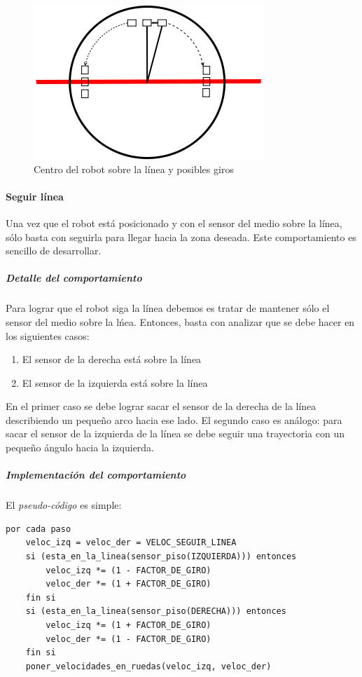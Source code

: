 \begin{figure}[htp]
\begin{center}
\includegraphics[scale=0.4]{comportamientos/floorSensorsLine3.png}
\caption{Centro del robot sobre la l\'inea y posibles giros}
\label{fig:positioned}
\end{center}
\end{figure}

\paragraph{Seguir l\'inea}
\label{follow_line}
Una vez que el robot est\'a posicionado y con el sensor del medio sobre la
l\'inea, s\'olo basta con seguirla para llegar hacia la zona deseada. Este
comportamiento es sencillo de desarrollar.

\subparagraph{Detalle del comportamiento}
Para lograr que el robot siga la l\'inea debemos es tratar de mantener
s\'olo el sensor del medio sobre la l\'nea. Entonces, basta con analizar que se
debe hacer en los siguientes casos:
\begin{enumerate}
	\item El sensor de la derecha est\'a sobre la l\'inea
	\item El sensor de la izquierda est\'a sobre la l\'inea
\end{enumerate}
En el primer caso se debe lograr sacar el sensor de la derecha de la l\'inea
describiendo un peque\~no arco hacia ese lado. El segundo caso es an\'alogo:
para sacar el sensor de la izquierda de la l\'inea se debe seguir una
trayectoria con un peque\~no \'angulo hacia la izquierda. 

\subparagraph{Implementaci\'on del comportamiento}
El \emph{pseudo-c\'odigo} es simple:
\begin{verbatim}
por cada paso
    veloc_izq = veloc_der = VELOC_SEGUIR_LINEA
    si (esta_en_la_linea(sensor_piso(IZQUIERDA))) entonces
        veloc_izq *= (1 - FACTOR_DE_GIRO)
        veloc_der *= (1 + FACTOR_DE_GIRO)
    fin si
    si (esta_en_la_linea(sensor_piso(DERECHA))) entonces
        veloc_izq *= (1 + FACTOR_DE_GIRO)
        veloc_der *= (1 - FACTOR_DE_GIRO)
    fin si
    poner_velocidades_en_ruedas(veloc_izq, veloc_der)
\end{verbatim}

